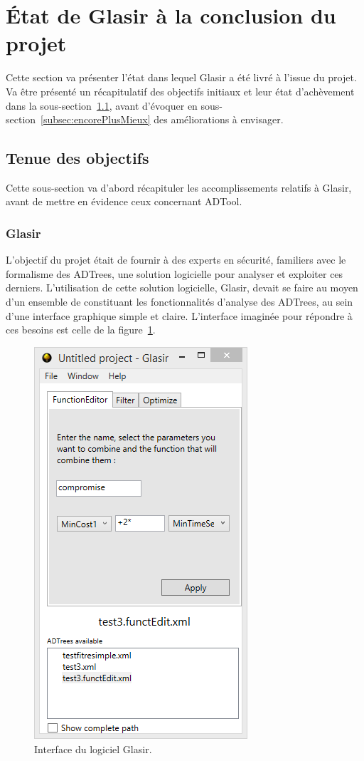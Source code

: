 \section{État de Glasir à la conclusion du projet}
\label{sec:etatFinal}

Cette section va présenter l'état dans lequel Glasir a été livré à l'issue du projet. Va être présenté un récapitulatif des objectifs initiaux et leur état d'achèvement dans la {\sc sous-section}~\ref{subsec:objOK}, avant d'évoquer en {\sc sous-section}~\ref{subsec:encorePlusMieux} des améliorations à envisager.

\subsection{Tenue des objectifs}
\label{subsec:objOK}

Cette sous-section va d'abord récapituler les accomplissements relatifs à Glasir, avant de mettre en évidence ceux concernant ADTool.

\subsubsection{Glasir}
\label{sssec:obj_glasir}

L'objectif du projet était de fournir à des experts en sécurité, familiers avec le formalisme des ADTrees, une solution logicielle pour analyser et exploiter ces derniers. L'utilisation de cette solution logicielle, Glasir, devait se faire au moyen d'un ensemble de \fg constituant les fonctionnalités d'analyse des ADTrees, au sein d'une interface graphique simple et claire. L'interface imaginée pour répondre à ces besoins est celle de la {\sc figure}~\ref{fig:InterfaceGlasir}.

    \begin{figure}[H]
        \centering
        \includegraphics[height=0.75\textwidth]{figure/interface.png}
        \caption{Interface du logiciel Glasir.}
        \label{fig:InterfaceGlasir}
    \end{figure}

